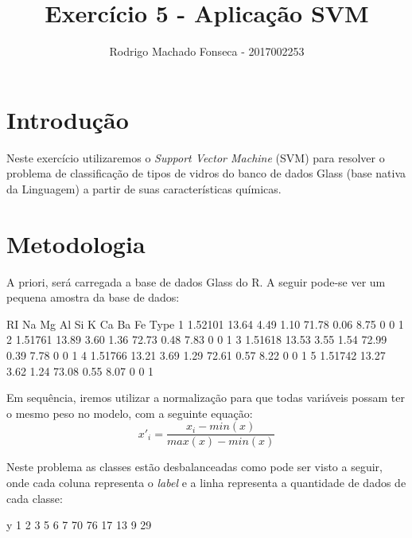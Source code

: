\documentclass[12pt]{article}
\begin{document}

\pagestyle{fancy}
\fancyhf{}
\renewcommand{\headrulewidth}{0.4pt}
\fancyfoot[C]{\thepage}
\renewcommand{\footrulewidth}{0.4pt}
\fancyfoot[C]{\thepage}
\title{\LARGE \bf
 Exercício 5  -  Aplicação SVM}
\author{ Rodrigo Machado Fonseca - 2017002253}
\thispagestyle{fancy}
\maketitle
\thispagestyle{fancy}

\section{Introdução}

  \par Neste exercício utilizaremos o \textit{Support Vector Machine} (SVM) para resolver o problema de classificação de tipos de vidros do banco de dados Glass (base nativa da Linguagem) a partir de suas características químicas.
  
\section{Metodologia}

  \par A priori, será carregada a base de dados Glass do R. A seguir pode-se ver um pequena amostra da base de dados:
\begin{Schunk}
\begin{Soutput}
       RI    Na   Mg   Al    Si    K   Ca Ba Fe Type
1 1.52101 13.64 4.49 1.10 71.78 0.06 8.75  0  0    1
2 1.51761 13.89 3.60 1.36 72.73 0.48 7.83  0  0    1
3 1.51618 13.53 3.55 1.54 72.99 0.39 7.78  0  0    1
4 1.51766 13.21 3.69 1.29 72.61 0.57 8.22  0  0    1
5 1.51742 13.27 3.62 1.24 73.08 0.55 8.07  0  0    1
\end{Soutput}
\end{Schunk}

  \par Em sequência, iremos utilizar a normalização para que todas variáveis possam ter o mesmo peso no modelo, com a seguinte equação:
\begin{equation}
x'_{i} = \frac{x_i - min(x)}{max(x) - min(x)}
\end{equation}
  \par Neste problema as classes estão desbalanceadas como pode ser visto a seguir, onde cada coluna representa o \textit{label} e a linha representa a quantidade de dados de cada classe:
\begin{Schunk}
\begin{Soutput}
y
 1  2  3  5  6  7 
70 76 17 13  9 29 
\end{Soutput}
\end{Schunk}
\end{document}
